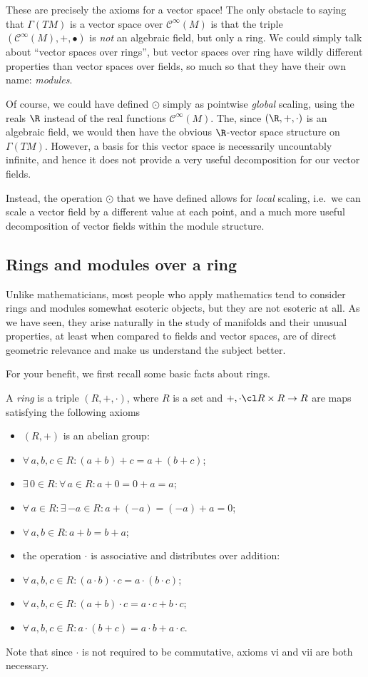 These are precisely the axioms for a vector space! The only obstacle to saying that $\Gamma(TM)$ is a vector space over $\mathcal{C}^\infty(M)$ is that the triple $(\mathcal{C}^\infty(M),+,\bullet)$ is \emph{not} an algebraic field, but only a ring. We could simply talk about ``vector spaces over rings'', but vector spaces over ring have wildly different properties than vector spaces over fields, so much so that they have their own name: \emph{modules}.

\br
Of course, we could have defined $\odot$ simply as pointwise \emph{global} scaling, using the reals $\R$ instead of the real functions $\mathcal{C}^\infty(M)$.
The, since $(\R,+,\cdot)$ is an algebraic field, we would then have the obvious $\R$-vector space structure on $\Gamma(TM)$. However, a basis for this vector space is necessarily uncountably infinite, and hence it does not provide a very useful decomposition for our vector fields.

Instead, the operation $\odot$ that we have defined allows for \emph{local} scaling, i.e.\ we can scale a vector field by a different value at each point, and a much more useful decomposition of vector fields within the module structure.
\er


\subsection{Rings and modules over a ring}

Unlike mathematicians, most people who apply mathematics tend to consider rings and modules somewhat esoteric objects, but they are not esoteric at all. As we have seen, they arise naturally in the study of manifolds and their unusual properties, at least when compared to fields and vector spaces, are of direct geometric relevance and make us understand the subject better.

For your benefit, we first recall some basic facts about rings.

\bd
A \emph{ring} is a triple $(R,+,\cdot)$, where $R$ is a set and $+,\cdot\cl R\times R\to R$ are maps satisfying the following axioms
\begin{itemize}
\item $(R,+)$ is an abelian group:
\ben[label=\roman*)]
\item $\forall \, a,b,c \in R : (a+b)+c=a+(b+c)$;
\item $\exists \, 0 \in R : \forall \, a \in R : a+0=0+a=a$;
\item $\forall \, a \in R : \exists \, {-a} \in R : a+(-a)=(-a)+a=0$;
\item $\forall \, a,b \in R : a+b=b+a$;
\een
\item the operation $\cdot$ is associative and distributes over addition:
\ben[label=\roman*),start=5]
\item $\forall \, a,b,c \in R : (a\cdot b)\cdot c=a\cdot (b\cdot c)$;
\item $\forall \, a,b,c \in R : (a+ b)\cdot c=a\cdot c + b\cdot c$;
\item $\forall \, a,b,c \in R : a \cdot (b+c)=a\cdot b + a\cdot c$.
\een
\end{itemize}
Note that since $\cdot$ is not required to be commutative, axioms vi and vii are both necessary.
\ed

